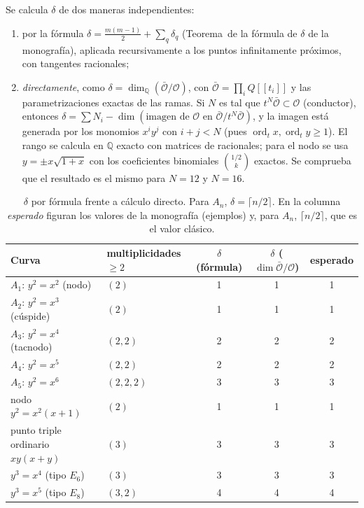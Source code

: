 \documentclass[11pt,a4paper]{article}
\newcommand{\QQ}{\mathbb{Q}}
\newcommand{\cO}{\mathcal{O}}
\theoremstyle{plain}
\theoremstyle{definition}
\theoremstyle{remark}
\begin{document}
Se calcula $\delta$ de dos maneras independientes:
\begin{enumerate}[label=(\roman*)]
\item por la fórmula $\delta=\frac{m(m-1)}2+\sum_q\delta_q$ (Teorema~de la fórmula de $\delta$ de la monografía), aplicada recursivamente a los puntos infinitamente próximos, con tangentes racionales;
\item \emph{directamente}, como $\delta=\dim_{\QQ}(\bar{\cO}/\cO)$, con $\bar{\cO}=\prod_iQ[[t_i]]$ y las parametrizaciones exactas de las ramas. Si $N$ es tal que $t^N\bar{\cO}\subset\cO$ (conductor), entonces $\delta=\sum N_i-\dim(\text{imagen de }\cO\text{ en }\bar{\cO}/t^N\bar{\cO})$, y la imagen está generada por los monomios $x^iy^j$ con $i+j<N$ (pues $\operatorname{ord}_t x,\operatorname{ord}_t y\ge1$). El rango se calcula en $\QQ$ exacto con matrices de racionales; para el nodo se usa $y=\pm x\sqrt{1+x}$ con los coeficientes binomiales $\binom{1/2}{k}$ exactos. Se comprueba que el resultado es el mismo para $N=12$ y $N=16$.
\end{enumerate}

\begin{table}[ht]
\centering
\small
\begin{tabular}{@{}l l c c c@{}}
\toprule
Curva & multiplicidades $\ge2$ & $\delta$ (fórmula) & $\delta$ ($\dim\bar{\cO}/\cO$) & esperado \\
\midrule
$A_1$: $y^2=x^2$ (nodo) & $(2)$ & 1 & 1 & 1 \\
$A_2$: $y^2=x^3$ (cúspide) & $(2)$ & 1 & 1 & 1 \\
$A_3$: $y^2=x^4$ (tacnodo) & $(2,2)$ & 2 & 2 & 2 \\
$A_4$: $y^2=x^5$ & $(2,2)$ & 2 & 2 & 2 \\
$A_5$: $y^2=x^6$ & $(2,2,2)$ & 3 & 3 & 3 \\
nodo $y^2=x^2(x+1)$ & $(2)$ & 1 & 1 & 1 \\
punto triple ordinario $xy(x+y)$ & $(3)$ & 3 & 3 & 3 \\
$y^3=x^4$ (tipo $E_6$) & $(3)$ & 3 & 3 & 3 \\
$y^3=x^5$ (tipo $E_8$) & $(3,2)$ & 4 & 4 & 4 \\
\bottomrule
\end{tabular}
\caption{$\delta$ por fórmula frente a cálculo directo. Para $A_n$, $\delta=\lceil n/2\rceil$. En la columna \emph{esperado} figuran los valores de la monografía (ejemplos) y, para $A_n$, $\lceil n/2\rceil$, que es el valor clásico.}
\end{table}
\end{document}
